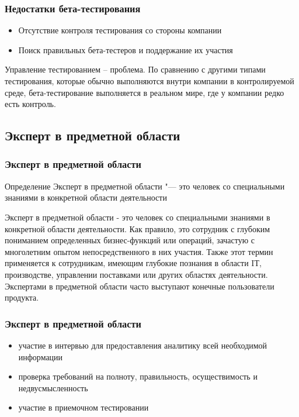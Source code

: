 \documentclass{../industrial-development}
\begin{document}
\begin{frame} \frametitle{Недостатки бета-тестирования}
	\begin{itemize}
		\item Отсутствие контроля тестирования со стороны компании
		\item Поиск правильных бета-тестеров и поддержание их участия
	\end{itemize}
\end{frame}

\lecturenotes
Управление тестированием – проблема. По сравнению с другими типами тестирования, которые обычно выполняются внутри компании в контролируемой среде, бета-тестирование выполняется в реальном мире, где у компании редко есть контроль.

\subsection{Эксперт в предметной области}
\begin{frame} \frametitle{Эксперт в предметной области}
	\begin{block}{Определение}
		\alert{Эксперт в предметной области} "--- это человек со специальными знаниями в конкретной области деятельности
	\end{block}
\end{frame}
\lecturenotes
Эксперт в предметной области - это человек со специальными знаниями в конкретной области деятельности. Как правило, это сотрудник с глубоким пониманием определенных бизнес-функций или операций, зачастую с многолетним опытом непосредственного в них участия. Также этот термин применяется к сотрудникам, имеющим глубокие познания в области IТ, производстве, управлении поставками или других областях деятельности.
Экспертами в предметной области часто выступают конечные пользователи продукта.

\begin{frame} \frametitle{Эксперт в предметной области}
	\begin{itemize}
		\item участие в интервью для предоставления аналитику всей необходимой информации
		\item проверка требований на полноту, правильность, осуществимость и недвусмысленность
		\item участие в приемочном тестировании
	\end{itemize}
\end{frame}

\begin{thebibliography}{99}
\end{thebibliography} 
\end{document}
